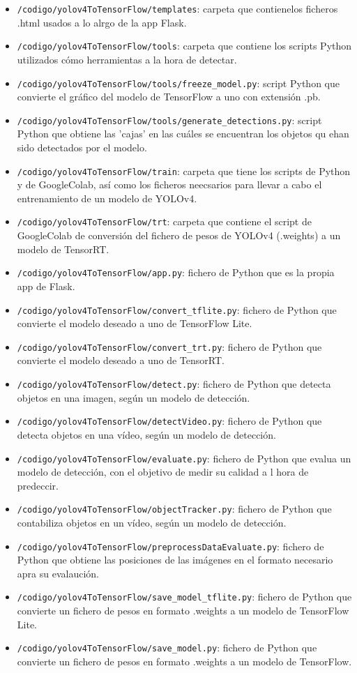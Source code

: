 \begin{itemize}
    \item \texttt{/codigo/yolov4ToTensorFlow/templates}: carpeta que contienelos ficheros .html usados a lo alrgo de la app Flask.
    \item \texttt{/codigo/yolov4ToTensorFlow/tools}: carpeta que contiene los scripts Python utilizados cómo herramientas a la hora de detectar.
    \item \texttt{/codigo/yolov4ToTensorFlow/tools/freeze\_model.py}: script Python que convierte el gráfico del modelo de TensorFlow a uno con extensión .pb.
    \item \texttt{/codigo/yolov4ToTensorFlow/tools/generate\_detections.py}: script Python que obtiene las 'cajas' en las cuáles se encuentran los objetos qu ehan sido detectados por el modelo.
    \item \texttt{/codigo/yolov4ToTensorFlow/train}: carpeta que tiene los scripts de Python y de GoogleColab, así como los ficheros neecsarios para llevar a cabo el entrenamiento de un modelo de YOLOv4.
    \item \texttt{/codigo/yolov4ToTensorFlow/trt}: carpeta que contiene el script de GoogleColab de conversión del fichero de pesos de YOLOv4 (.weights) a un modelo de TensorRT.
    \item \texttt{/codigo/yolov4ToTensorFlow/app.py}: fichero de Python que es la propia app de Flask.
    \item \texttt{/codigo/yolov4ToTensorFlow/convert\_tflite.py}: fichero de Python que convierte el modelo deseado a uno de TensorFlow Lite.
    \item \texttt{/codigo/yolov4ToTensorFlow/convert\_trt.py}: fichero de Python que convierte el modelo deseado a uno de TensorRT.
    \item \texttt{/codigo/yolov4ToTensorFlow/detect.py}: fichero de Python que detecta objetos en una imagen, según un modelo de detección.
    \item \texttt{/codigo/yolov4ToTensorFlow/detectVideo.py}: fichero de Python que detecta objetos en una vídeo, según un modelo de detección.
    \item \texttt{/codigo/yolov4ToTensorFlow/evaluate.py}: fichero de Python que evalua un modelo de detección, con el objetivo de medir su calidad a l hora de predeccir.
    \item \texttt{/codigo/yolov4ToTensorFlow/objectTracker.py}: fichero de Python que contabiliza objetos en un vídeo, según un modelo de detección.
    \item \texttt{/codigo/yolov4ToTensorFlow/preprocessDataEvaluate.py}: fichero de Python que obtiene las posiciones de las imágenes en el formato necesario apra su evalaución.
    \item \texttt{/codigo/yolov4ToTensorFlow/save\_model\_tflite.py}: fichero de Python que convierte un fichero de pesos en formato .weights a un modelo de TensorFlow Lite. 
    \item \texttt{/codigo/yolov4ToTensorFlow/save\_model.py}: fichero de Python que convierte un fichero de pesos en formato .weights a un modelo de TensorFlow.  
\end{itemize}

